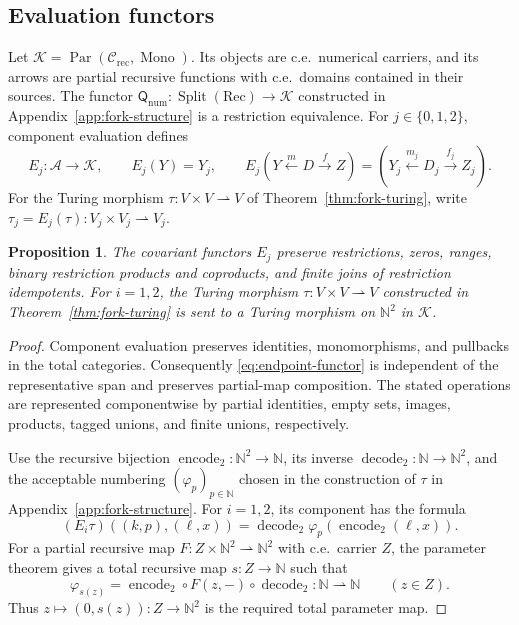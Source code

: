 \documentclass[11pt]{article}
\newtheorem{proposition}[theorem]{Proposition}
\newcommand{\N}{\mathbb N}
\begin{document}
\subsection{Evaluation functors}

Let
$\mathcal K=\operatorname{Par}(\mathcal C_{\mathrm{rec}},\operatorname{Mono})$.
Its objects are c.e.\ numerical carriers, and its arrows are partial
recursive functions with c.e.\ domains contained in their sources.
The functor
$\mathsf Q_{\mathrm{num}}:\operatorname{Split}(\mathrm{Rec})\to\mathcal K$
constructed in Appendix~\ref{app:fork-structure} is a restriction
equivalence.
For $j\in\{0,1,2\}$, component evaluation defines
\begin{equation}\label{eq:endpoint-functor}
 E_j:\mathcal A\longrightarrow\mathcal K,\qquad
 E_j(Y)=Y_j,\qquad
 E_j(Y\xleftarrow{m}D\xrightarrow{f}Z)
   =(Y_j\xleftarrow{m_j}D_j\xrightarrow{f_j}Z_j).
\end{equation}
For the Turing morphism $\tau:V\times V\rightharpoonup V$ of
Theorem~\ref{thm:fork-turing}, write
$\tau_j=E_j(\tau):V_j\times V_j\rightharpoonup V_j$.

\begin{proposition}\label{prop:endpoint}
The covariant functors $E_j$ preserve restrictions, zeros, ranges,
binary restriction products and coproducts, and finite joins of
restriction idempotents.
For $i=1,2$, the Turing morphism
$\tau:V\times V\rightharpoonup V$ constructed in
Theorem~\ref{thm:fork-turing} is sent
to a Turing morphism on $\N^2$ in $\mathcal K$.
\end{proposition}
\begin{proof}
Component evaluation preserves identities, monomorphisms, and
pullbacks in the total categories. Consequently \eqref{eq:endpoint-functor}
is independent of the representative span and preserves partial-map
composition. The stated operations are represented componentwise by
partial identities, empty sets, images, products, tagged unions, and
finite unions, respectively.

Use the recursive bijection $\operatorname{encode}_2:\N^2\to\N$,
its inverse $\operatorname{decode}_2:\N\to\N^2$, and the acceptable numbering
$(\varphi_p)_{p\in\N}$ chosen in the construction of $\tau$ in
Appendix~\ref{app:fork-structure}. For $i=1,2$, its component has
the formula
\[
 (E_i\tau)((k,p),(\ell,x))
 =\operatorname{decode}_2\varphi_p(\operatorname{encode}_2(\ell,x)).
\]
For a partial recursive map
$F:Z\times\N^2\rightharpoonup\N^2$ with c.e.\ carrier $Z$,
the parameter theorem gives a total recursive map $s:Z\to\N$ such that
\[
 \varphi_{s(z)}
 =\operatorname{encode}_2\circ F(z,-)\circ\operatorname{decode}_2
 :\N\rightharpoonup\N
 \qquad(z\in Z).
\]
Thus $z\mapsto(0,s(z)):Z\to\N^2$ is the required total parameter map.
\end{proof}
\end{document}
